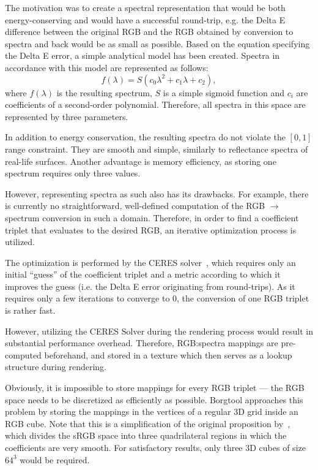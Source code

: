 The motivation was to create a spectral representation that would be both energy-conserving and would have a successful round-trip, e.g. the Delta E difference between the original RGB and the RGB obtained by conversion to spectra and back would be as small as possible. Based on the equation specifying the Delta E error, a simple analytical model has been created. Spectra in accordance with this model are represented as follows:
\begin{equation} \label{sigmoidRepresentation}
f(\lambda)=S(c_{0}\lambda^2+c_{1}\lambda+c_{2}),
\end{equation}
where $f(\lambda)$ is the resulting spectrum, $S$ is a simple sigmoid function and $c_{i}$ are coefficients of a second-order polynomial. Therefore, all spectra in this space are represented by three parameters.

In addition to energy conservation, the resulting spectra do not violate the $[0,1]$ range constraint. They are smooth and simple, similarly to reflectance spectra of real-life surfaces. Another advantage is memory efficiency, as storing one spectrum requires only three values.

However, representing spectra as such also has its drawbacks. For example, there is currently no straightforward, well-defined computation of the RGB $\to$ spectrum conversion in such a domain. Therefore, in order to find a coefficient triplet that evaluates to the desired RGB, an iterative optimization process is utilized.

The optimization is performed by the CERES solver~\cite{ceres-solver}, which requires only an initial ``guess'' of the coefficient triplet and a metric according to which it improves the guess (i.e. the Delta E error originating from round-trips). As it requires only a few iterations to converge to 0, the conversion of one RGB triplet is rather fast.

However, utilizing the CERES Solver during the rendering process would result in substantial performance overhead. Therefore, RGB:spectra mappings are pre-computed beforehand, and stored in a texture which then serves as a lookup structure during rendering.

Obviously, it is impossible to store mappings for every RGB triplet --- the RGB space needs to be discretized as efficiently as possible. Borgtool approaches this problem by storing the mappings in the vertices of a regular 3D grid inside an RGB cube. Note that this is a simplification of the original proposition by~\citet{upsamplingJakobHanika}, which divides the sRGB space into three quadrilateral regions in which the coefficients are very smooth. For satisfactory results, only three 3D cubes of size $64^3$ would be required.

